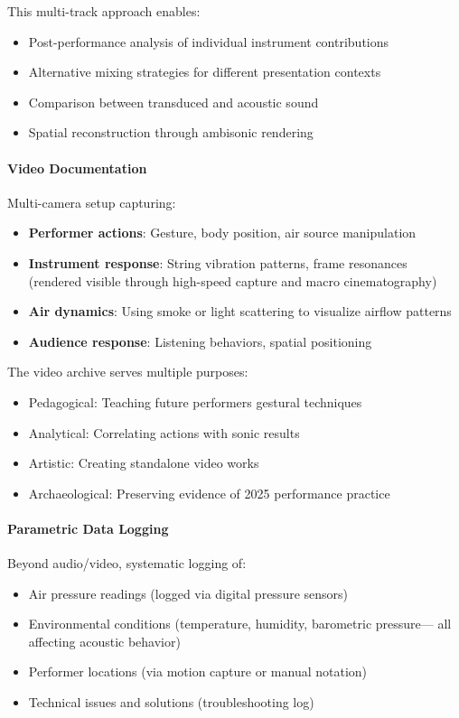This multi-track approach enables:
\begin{itemize}
  \item Post-performance analysis of individual instrument contributions
  \item Alternative mixing strategies for different presentation contexts
  \item Comparison between transduced and acoustic sound
  \item Spatial reconstruction through ambisonic rendering
\end{itemize}

\paragraph{Video Documentation}
Multi-camera setup capturing:
\begin{itemize}
  \item \textbf{Performer actions}: Gesture, body position, air source 
  manipulation
  \item \textbf{Instrument response}: String vibration patterns, frame 
  resonances (rendered visible through high-speed capture and macro 
  cinematography)
  \item \textbf{Air dynamics}: Using smoke or light scattering to visualize 
  airflow patterns
  \item \textbf{Audience response}: Listening behaviors, spatial positioning
\end{itemize}

The video archive serves multiple purposes:
\begin{itemize}
  \item Pedagogical: Teaching future performers gestural techniques
  \item Analytical: Correlating actions with sonic results
  \item Artistic: Creating standalone video works
  \item Archaeological: Preserving evidence of 2025 performance practice
\end{itemize}

\paragraph{Parametric Data Logging}
Beyond audio/video, systematic logging of:
\begin{itemize}
  \item Air pressure readings (logged via digital pressure sensors)
  \item Environmental conditions (temperature, humidity, barometric pressure---
  all affecting acoustic behavior)
  \item Performer locations (via motion capture or manual notation)
  \item Technical issues and solutions (troubleshooting log)
\end{itemize}

